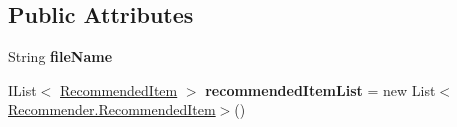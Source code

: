 \subsection*{Public Attributes}
\begin{DoxyCompactItemize}
\item 
\hypertarget{classcom_1_1shephertz_1_1app42_1_1paas_1_1sdk_1_1windows_1_1recommend_1_1_recommender_aaf18ae818d73e785d0d30248b928bd16}{String {\bfseries file\+Name}}\label{classcom_1_1shephertz_1_1app42_1_1paas_1_1sdk_1_1windows_1_1recommend_1_1_recommender_aaf18ae818d73e785d0d30248b928bd16}

\item 
\hypertarget{classcom_1_1shephertz_1_1app42_1_1paas_1_1sdk_1_1windows_1_1recommend_1_1_recommender_a73d116393ee259d43ee20e905b5a3d1f}{I\+List$<$ \hyperlink{classcom_1_1shephertz_1_1app42_1_1paas_1_1sdk_1_1windows_1_1recommend_1_1_recommender_1_1_recommended_item}{Recommended\+Item} $>$ {\bfseries recommended\+Item\+List} = new List$<$\hyperlink{classcom_1_1shephertz_1_1app42_1_1paas_1_1sdk_1_1windows_1_1recommend_1_1_recommender_1_1_recommended_item}{Recommender.\+Recommended\+Item}$>$()}\label{classcom_1_1shephertz_1_1app42_1_1paas_1_1sdk_1_1windows_1_1recommend_1_1_recommender_a73d116393ee259d43ee20e905b5a3d1f}

\end{DoxyCompactItemize}
